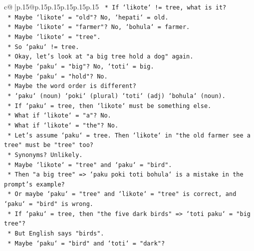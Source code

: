 \documentclass{article}
\begin{document}
{\begin{supertabular}{c@{$\;$}|p{.15\linewidth}@{}p{.15\linewidth}p{.15\linewidth}p{.15\linewidth}p{.15\linewidth}p{.15\linewidth}}
{{{\texttt{                        *   If `likote` != tree, what is it?} \\
\texttt{                        *   Maybe `likote` = "old"? No, `hepati` = old.} \\
\texttt{                        *   Maybe `likote` = "farmer"? No, `bohula` = farmer.} \\
\texttt{                        *   Maybe `likote` = "tree".} \\
\texttt{                        *   So `paku` != tree.} \\
\texttt{                        *   Okay, let's look at "a big tree hold a dog" again.} \\
\texttt{                        *   Maybe `paku` = "big"? No, `toti` = big.} \\
\texttt{                        *   Maybe `paku` = "hold"? No.} \\
\texttt{                        *   Maybe the word order is different?} \\
\texttt{                        *   `paku` (noun) `poki` (plural) `toti` (adj) `bohula` (noun).} \\
\texttt{                        *   If `paku` = tree, then `likote` must be something else.} \\
\texttt{                        *   What if `likote` = "a"? No.} \\
\texttt{                        *   What if `likote` = "the"? No.} \\
\texttt{                        *   Let's assume `paku` = tree. Then `likote` in "the old farmer see a tree" must be "tree" too?} \\
\texttt{                        *   Synonyms? Unlikely.} \\
\texttt{                        *   Maybe `likote` = "tree" and `paku` = "bird".} \\
\texttt{                        *   Then "a big tree" => `paku poki toti bohula` is a mistake in the prompt's example?} \\
\texttt{                        *   Or maybe `paku` = "tree" and `likote` = "tree" is correct, and `paku` = "bird" is wrong.} \\
\texttt{                        *   If `paku` = tree, then "the five dark birds" => `toti paku` = "big tree"?} \\
\texttt{                        *   But English says "birds".} \\
\texttt{                        *   Maybe `paku` = "bird" and `toti` = "dark"?} \\
}}}
\end{supertabular}}
\end{document}

